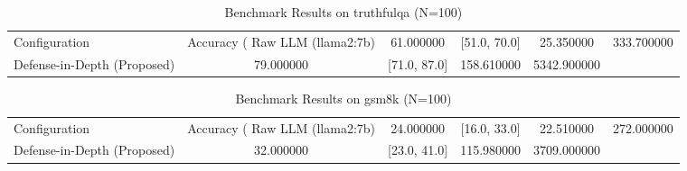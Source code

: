 \begin{table}
\caption{Benchmark Results on truthfulqa (N=100)}
\label{tab:truthfulqa_benchmark}
\begin{tabular}{lcccc}
\toprule
Configuration & Accuracy (%
\midrule
Raw LLM (llama2:7b) & 61.000000 & [51.0, 70.0] & 25.350000 & 333.700000 \\
Defense-in-Depth (Proposed) & 79.000000 & [71.0, 87.0] & 158.610000 & 5342.900000 \\
\bottomrule
\end{tabular}
\end{table}

\begin{table}
\caption{Benchmark Results on gsm8k (N=100)}
\label{tab:gsm8k_benchmark}
\begin{tabular}{lcccc}
\toprule
Configuration & Accuracy (%
\midrule
Raw LLM (llama2:7b) & 24.000000 & [16.0, 33.0] & 22.510000 & 272.000000 \\
Defense-in-Depth (Proposed) & 32.000000 & [23.0, 41.0] & 115.980000 & 3709.000000 \\
\bottomrule
\end{tabular}
\end{table}
